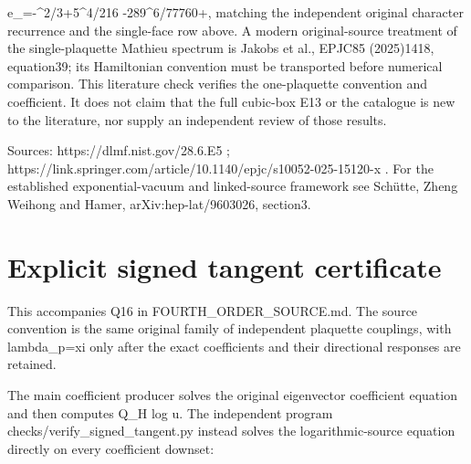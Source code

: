 \documentclass[11pt,a4paper]{article}
\let\originalsection\section
\renewcommand{\section}{\clearpage\originalsection}
\renewcommand{\[}{\begingroup\small\originaldisplaystart}
\renewcommand{\]}{\originaldisplayend\endgroup}
\begin{document}
\[
 e_{}=-\xi^2/3+5\xi^4/216
                         -289\xi^6/77760+\cdots,
\] matching the independent original character recurrence and the
single-face row above. A modern original-source treatment of the
single-plaquette Mathieu spectrum is Jakobs et al., EPJC85 (2025)1418,
equation39; its Hamiltonian convention must be transported before
numerical comparison. This literature check verifies the one-plaquette
convention and coefficient. It does not claim that the full cubic-box
E13 or the catalogue is new to the literature, nor supply an independent
review of those results.

Sources: https://dlmf.nist.gov/28.6.E5 ;
https://link.springer.com/article/10.1140/epjc/s10052-025-15120-x . For
the established exponential-vacuum and linked-source framework see
Schütte, Zheng Weihong and Hamer, arXiv:hep-lat/9603026, section3.

\section{Explicit signed tangent
certificate}\label{explicit-signed-tangent-certificate}

This accompanies Q16 in
{\ttfamily F\allowbreak{}O\allowbreak{}U\allowbreak{}R\allowbreak{}T\allowbreak{}H\allowbreak{}\_\allowbreak{}O\allowbreak{}R\allowbreak{}D\allowbreak{}E\allowbreak{}R\allowbreak{}\_\allowbreak{}S\allowbreak{}O\allowbreak{}U\allowbreak{}R\allowbreak{}C\allowbreak{}E\allowbreak{}.\allowbreak{}m\allowbreak{}d\allowbreak{}}.
The source convention is the same original family of independent
plaquette couplings, with
{\ttfamily l\allowbreak{}a\allowbreak{}m\allowbreak{}b\allowbreak{}d\allowbreak{}a\allowbreak{}\_\allowbreak{}p\allowbreak{}=\allowbreak{}x\allowbreak{}i\allowbreak{}}
only after the exact coefficients and their directional responses are
retained.

The main coefficient producer solves the original eigenvector
coefficient equation and then computes
{\ttfamily Q\allowbreak{}\_\allowbreak{}H\allowbreak{} \allowbreak{}l\allowbreak{}o\allowbreak{}g\allowbreak{} \allowbreak{}u\allowbreak{}}.
The independent program
{\ttfamily c\allowbreak{}h\allowbreak{}e\allowbreak{}c\allowbreak{}k\allowbreak{}s\allowbreak{}/\allowbreak{}v\allowbreak{}e\allowbreak{}r\allowbreak{}i\allowbreak{}f\allowbreak{}y\allowbreak{}\_\allowbreak{}s\allowbreak{}i\allowbreak{}g\allowbreak{}n\allowbreak{}e\allowbreak{}d\allowbreak{}\_\allowbreak{}t\allowbreak{}a\allowbreak{}n\allowbreak{}g\allowbreak{}e\allowbreak{}n\allowbreak{}t\allowbreak{}.\allowbreak{}p\allowbreak{}y\allowbreak{}}
instead solves the logarithmic-source equation directly on every
coefficient downset:
\end{document}
